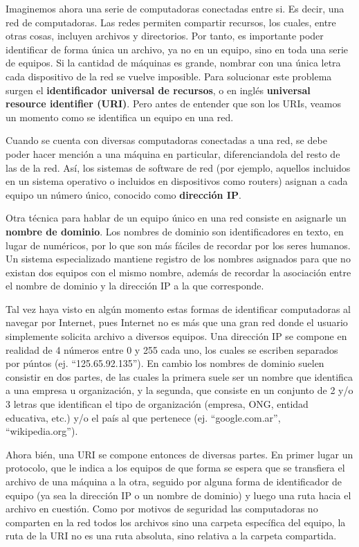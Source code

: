 Imaginemos ahora una serie de computadoras conectadas entre si. Es decir, una red
de computadoras. Las redes permiten compartir recursos, los cuales, entre otras
cosas, incluyen archivos y directorios. Por tanto, es importante poder identificar
de forma única un archivo, ya no en un equipo, sino en toda una serie de equipos.
Si la cantidad de máquinas es grande, nombrar con una única letra cada dispositivo
de la red se vuelve imposible. Para solucionar este problema surgen el \textbf{
identificador universal de recursos}, o en inglés \textbf{universal resource
identifier (URI)}. Pero antes de entender que son los URIs, veamos un momento
como se identifica un equipo en una red.

Cuando se cuenta con diversas computadoras conectadas a una red, se debe poder
hacer mención a una máquina en particular, diferenciandola del resto de las de
la red. Así, los sistemas de software de red (por ejemplo, aquellos incluidos
en un sistema operativo o incluidos en dispositivos como routers) asignan a cada
equipo un número único, conocido como \textbf{dirección IP}. 

Otra técnica para hablar de un equipo único en una red consiste en asignarle un
\textbf{nombre de dominio}. Los nombres de dominio son identificadores en texto,
en lugar de numéricos, por lo que son más fáciles de recordar por los seres humanos.
Un sistema especializado mantiene registro de los nombres asignados para que no
existan dos equipos con el mismo nombre, además de recordar la asociación entre
el nombre de dominio y la dirección IP a la que corresponde.

Tal vez haya visto en algún momento estas formas de identificar computadoras
al navegar por Internet, pues Internet no es más que una gran red donde el
usuario simplemente solicita archivo a diversos equipos. Una dirección IP
se compone en realidad de 4 números entre 0 y 255 cada uno, los cuales se
escriben separados por púntos (ej. ``125.65.92.135''). En cambio los nombres
de dominio suelen consistir en dos partes, de las cuales la primera suele ser
un nombre que identifica a una empresa u organización, y la segunda, que consiste
en un conjunto de 2 y/o 3 letras que identifican el tipo de organización (empresa,
ONG, entidad educativa, etc.) y/o el país al que pertenece (ej. ``google.com.ar'',
``wikipedia.org'').

Ahora bién, una URI se compone entonces de diversas partes. En primer lugar un
protocolo, que le indica a los equipos de que forma se espera que se transfiera
el archivo de una máquina a la otra, seguido por alguna forma de identificador
de equipo (ya sea la dirección IP o un nombre de dominio) y luego una ruta hacia
el archivo en cuestión. Como por motivos de seguridad las computadoras no
comparten en la red todos los archivos sino una carpeta específica del equipo,
la ruta de la URI no es una ruta absoluta, sino relativa a la carpeta compartida.
\autocite{rfc7320_2014}

